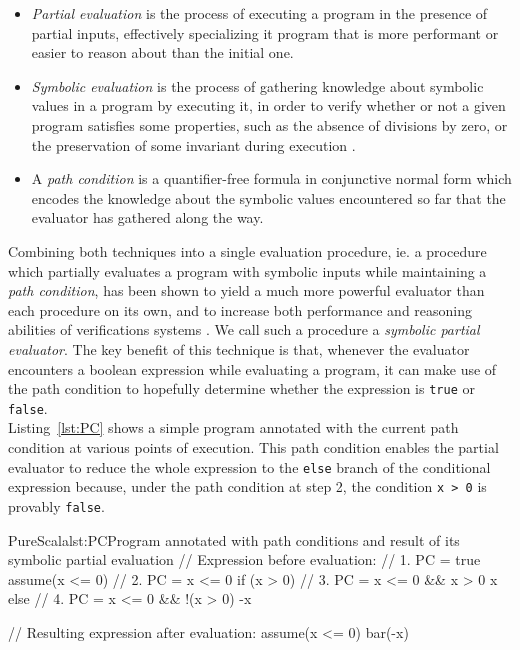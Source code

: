 \documentclass[a4paper,twoside]{article}
\newcommand{\InlineS}[1]{\lstinline[language=PureScala,basicstyle=\small\ttfamily,columns=fixed]|#1|}
\newcommand{\RefCode}[1]{Listing~\ref{#1}}
\begin{document}
\begin{itemize}
\item \textit{Partial evaluation} \cite{Jones:1993:PEA:153676} is the process of executing a program in the presence of partial inputs, effectively specializing it  program that is more performant or easier to reason about than the initial one.
\item \textit{Symbolic evaluation} \cite{King:1970:PV:905403, King:1976:SEP:360248.360252} is the process of gathering knowledge about symbolic values in a program by executing it, in order to verify whether or not a given program satisfies some properties, such as the absence of divisions by zero, or the preservation of some invariant during execution \cite{DBLP:journals/corr/BaldoniCDDF16}.
\item A \textit{path condition} is a quantifier-free formula in conjunctive normal form which encodes the knowledge about the symbolic values encountered so far that the evaluator has gathered along the way.
\end{itemize}

Combining both techniques into a single evaluation procedure, ie. a procedure which partially evaluates a program with symbolic inputs while maintaining a \textit{path condition}, has been shown to yield a much more powerful evaluator than each procedure on its own, and to increase both performance and reasoning abilities of verifications systems \cite{partialsym}. We call such a procedure a \textit{symbolic partial evaluator}. The key benefit of this technique is that, whenever the evaluator encounters a boolean expression while evaluating a program, it can make use of the path condition to hopefully determine whether the expression is \InlineS{true} or \InlineS{false}.\\

\RefCode{lst:PC} shows a simple program annotated with the current path condition at various points of execution. This path condition enables the partial evaluator to reduce the whole expression to the \InlineS{else} branch of the conditional expression  because, under the path condition at step 2, the condition \InlineS{x > 0} is provably \InlineS{false}.

\begin{Code}{PureScala}{lst:PC}{Program annotated with path conditions and result of its symbolic partial evaluation}
// Expression before evaluation:
{
  // 1. PC = true
  assume(x <= 0)
  // 2. PC = x <= 0
  if (x > 0) {
    // 3. PC = x <= 0 && x > 0
    x
  } else {
    // 4. PC = x <= 0 && !(x > 0)
    -x
  }
}

// Resulting expression after evaluation:
{
  assume(x <= 0)
  bar(-x)
}
\end{Code}
\end{document}
